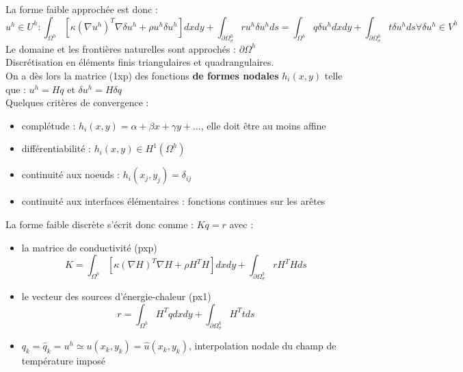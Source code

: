 \documentclass[../main.tex]{subfiles}
\begin{document}
La forme faible approchée est donc : \\
\begin{equation}
    u^h \in U^h : \int_{\Omega^h} [\kappa(\nabla u^h)^T \nabla \delta u^h + \rho u^h \delta u^h]dxdy + \int_{\partial \Omega_\sigma^h} ru^h \delta u^h ds = \int_{\Omega^h} q \delta u^h dxdy + \int_{\partial \Omega_\sigma^h} t \delta u^hds \forall \delta u^h \in V^h
\end{equation}
\warning Le domaine et les frontières naturelles sont approchés : $\partial \Omega^h$\\

Discrétisation en éléments finis triangulaires et quadrangulaires.\\

On a dès lors la matrice (1xp) des fonctions \textbf{de formes nodales} $h_i(x,y)$ telle que : $u^h = Hq$ et $\delta u^h = H\delta q$\\

Quelques critères de convergence : \begin{itemize}
    \item complétude : $h_i(x,y) = \alpha + \beta x+ \gamma y + \dots$, elle doit être au moins affine\\
    \item différentiabilité : $h_i(x,y) \in H^1(\Omega^h)$\\
    \item continuité aux noeuds : $h_i(x_j,y_j) = \delta_{ij}$\\
    \item continuité aux interfaces élémentaires : fonctions continues sur les arêtes\\
\end{itemize}

La forme faible discrète s'écrit donc comme : $Kq=r$ avec : \begin{itemize}
    \item la matrice de conductivité (pxp) \begin{equation}
        K = \int_{\Omega^h} [\kappa (\nabla H)^T \nabla H + \rho H^T H]dxdy + \int_{\partial \Omega_\sigma^h}rH^THds
    \end{equation}
    \item le vecteur des sources d'énergie-chaleur (px1) \begin{equation}
        r = \int_{\Omega^h} H^T q dxdy + \int_{\partial \Omega_\sigma^h} H^Ttds
    \end{equation}
    \item $q_k = \hat{q}_k = u^h \simeq u(x_k,y_k) = \hat{u}(x_k,y_k)$, interpolation nodale du champ de température imposé\\
\end{itemize}
\end{document}
